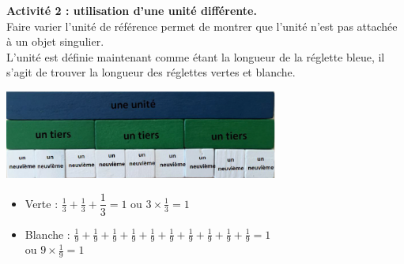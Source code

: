 \begin{exercice*}
{\bf Activité 2 : utilisation d'une unité différente.} \\
   Faire varier l’unité de référence permet de montrer que l’unité n’est pas attachée à un objet singulier. \\
   L’unité est définie maintenant comme étant la longueur de la réglette bleue, il s’agit de trouver la longueur des réglettes vertes et blanche. \\ [2mm]
   \begin{minipage}{9cm}
            \includegraphics[width=9cm]{Nombres_et_calculs_did/Images/Num4_activites_Cuisenaire_A2}
   \end{minipage}
   \quad
   \begin{minipage}{8cm}
      \begin{itemize}
         \item Verte : $\frac13+\frac13+\dfrac13 =1$ ou $3\times\frac13 =1$ \medskip
         \item Blanche : $\frac1{9}+\frac1{9}+\frac1{9}+\frac1{9}+\frac1{9}+\frac1{9}+\frac1{9}+\frac1{9}+\frac1{9}+\frac1{9} =1$  \\ [1mm] ou $9\times\frac1{9} =1$
      \end{itemize}
   \end{minipage}
   
   \pagebreak
   

\end{exercice*}
